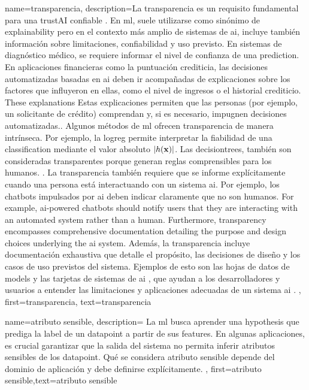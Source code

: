 {name={transparencia},
	description={La transparencia es un requisito fundamental para una 
		\gls{trustAI} confiable \cite{HLEGTrustworhtyAI}. En \gls{ml},
		suele utilizarse como sinónimo de \gls{explainability} \cite{gallese2023ai,JunXML2020}
		pero en el contexto más amplio de sistemas de \gls{ai}, 
		incluye también información sobre limitaciones, confiabilidad y uso previsto. 
		En sistemas de diagnóstico médico, se requiere informar el nivel de confianza de una \gls{prediction}.
		En aplicaciones financieras como la puntuación crediticia, las decisiones automatizadas basadas en \gls{ai}
		deben ir acompañadas de explicaciones sobre los factores que influyeron en ellas, como el nivel de ingresos o el historial crediticio. These explanations 
		Estas explicaciones permiten que las personas (por ejemplo, un solicitante de crédito) comprendan y, 
		si es necesario, impugnen decisiones automatizadas.. 
		Algunos métodos de \gls{ml} ofrecen transparencia de manera intrínseca. Por ejemplo, la \gls{logreg} 
		permite interpretar la fiabilidad de una \gls{classification} mediante el valor absoluto $|h({\bf x})|$. 
		Las \gls{decisiontree}s,  también son consideradas transparentes porque generan reglas comprensibles para los humanos.
		\cite{rudin2019stop}.
		La transparencia también requiere que se informe explícitamente cuando una persona está interactuando con un sistema \gls{ai}.
		Por ejemplo, los chatbots impulsados por \gls{ai} deben indicar claramente que no son humanos. 
		For example, \gls{ai}-powered chatbots should notify users that they are interacting with an 
		automated system rather than a human. Furthermore, transparency encompasses comprehensive 
		documentation detailing the purpose and design choices underlying the \gls{ai} system. 
		Además, la transparencia incluye documentación exhaustiva que detalle el propósito, las decisiones de diseño y los casos de uso previstos del sistema.
		Ejemplos de esto son las hojas de datos de \gls{model}s \cite{DatasheetData2021}
		 y las tarjetas de sistemas de \gls{ai} \cite{10.1145/3287560.3287596}, 
		 que ayudan a los desarrolladores y usuarios a entender las limitaciones y aplicaciones adecuadas de un sistema \gls{ai} \cite{Shahriari2017}.
		 },
	first={transparencia}, text={transparencia} 
}


{
	name=atributo sensible,
	description={
		La \gls{ml} busca aprender una \gls{hypothesis} que prediga la \gls{label} de un \gls{datapoint} a partir de sus \gls{feature}s.
		En algunas aplicaciones, es crucial garantizar que la salida del sistema no permita inferir atributos sensibles de los \gls{datapoint}.
		Qué se considera atributo sensible depende del dominio de aplicación y debe definirse explícitamente.
	},
	first={atributo sensible},text={atributo sensible}
}

